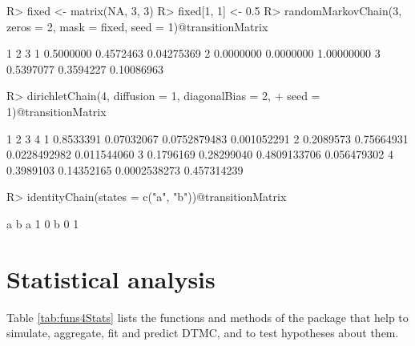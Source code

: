 \documentclass[
  nojss]{jss}
\begin{document}
\begin{CodeChunk}
\begin{CodeInput}
R> fixed <- matrix(NA, 3, 3)
R> fixed[1, 1] <- 0.5
R> randomMarkovChain(3, zeros = 2, mask = fixed, seed = 1)@transitionMatrix
\end{CodeInput}
\begin{CodeOutput}
          1         2          3
1 0.5000000 0.4572463 0.04275369
2 0.0000000 0.0000000 1.00000000
3 0.5397077 0.3594227 0.10086963
\end{CodeOutput}
\begin{CodeInput}
R> dirichletChain(4, diffusion = 1, diagonalBias = 2,
+                seed = 1)@transitionMatrix
\end{CodeInput}
\begin{CodeOutput}
          1          2            3           4
1 0.8533391 0.07032067 0.0752879483 0.001052291
2 0.2089573 0.75664931 0.0228492982 0.011544060
3 0.1796169 0.28299040 0.4809133706 0.056479302
4 0.3989103 0.14352165 0.0002538273 0.457314239
\end{CodeOutput}
\begin{CodeInput}
R> identityChain(states = c("a", "b"))@transitionMatrix
\end{CodeInput}
\begin{CodeOutput}
  a b
a 1 0
b 0 1
\end{CodeOutput}
\end{CodeChunk}

\section{Statistical analysis}\label{sec:statistics}

Table \ref{tab:funs4Stats} lists the functions and methods of the package that help to simulate, aggregate, fit and predict DTMC, and to test hypotheses about them.
\end{document}
